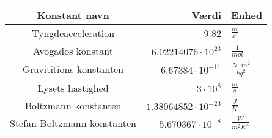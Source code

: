 \begin{tabular}{|c|r|l|}
	\hline
	Konstant navn&Værdi&Enhed\\
	\hline
	Tyngdeacceleration&9.82&$\frac{m}{s^2}$\\
	Avogados konstant&$6.02214076\cdot 10^{23}$&$\frac{1}{mol}$\\
	Gravititions konstanten&$6.67384\cdot 10^{-11}$&$\frac{N\cdot m^2}{kg^2}$\\
	Lysets hastighed&$3\cdot 10^8$&$\frac{m}{s}$\\
	Boltzmann konstanten&$1.38064852\cdot 10^{-23}$&$\frac{J}{K}$\\
	Stefan-Boltzmann konstanten&$5.670367\cdot 10^{-8}$&$\frac{W}{m^2K^4}$\\
	\hline
\end{tabular}
